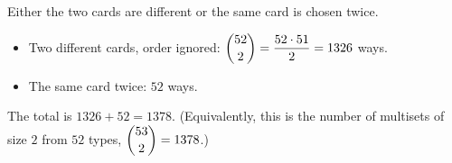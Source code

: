 Either the two cards are different or the same card is chosen twice.
\begin{itemize}
\item Two different cards, order ignored: $\dbinom{52}{2}=\dfrac{52\cdot51}{2}=1326$ ways.
\item The same card twice: $52$ ways.
\end{itemize}
The total is $1326+52=\boxed{1378}$. (Equivalently, this is the number of multisets of size $2$ from $52$ types, $\dbinom{53}{2}=1378$.)

